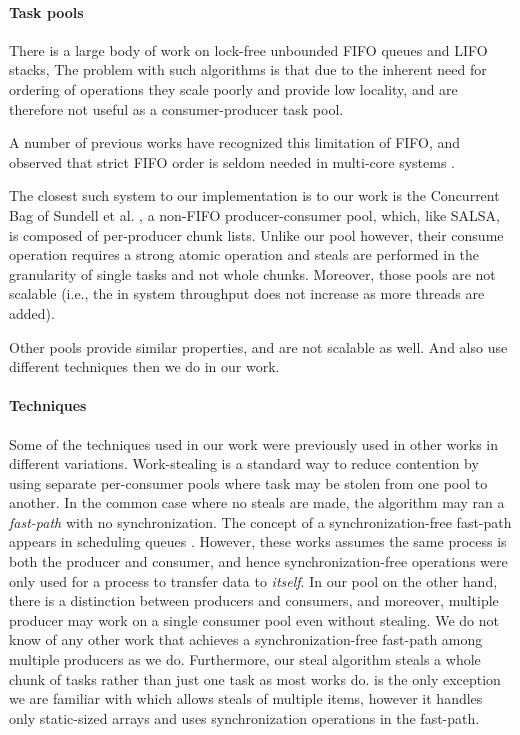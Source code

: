 \paragraph{Task pools\\}
There is a large body of work on lock-free unbounded FIFO queues and LIFO
stacks\cite{Gidenstam:2010:CLQ:1940234.1940266,Hendler:2004:SLS:1007912.1007944,
Hoffman:2007:BQ:1782394.1782423, Michael:1996:SFP:248052.248106,Moir:2005:UEI:1073970.1074013},
The problem with such algorithms is that due to the inherent need for ordering of operations they
scale poorly and provide low locality, and are therefore not useful as a consumer-producer task
pool. 

A number of previous works have recognized this limitation of FIFO, and observed that strict FIFO
order is seldom needed in multi-core systems
\cite{Afek:2010:SPP:1885276.1885295,springerlink:10.1007/978-3-642-17653-1_29,
Basin:2011:CST:2075029.2075087,Sundell:2011:LAC:1989493.1989550}. 

The closest such system to our implementation is to our work is the Concurrent Bag of Sundell et al.
\cite{Sundell:2011:LAC:1989493.1989550}, a non-FIFO producer-consumer pool, which, like SALSA, is
composed of per-producer chunk lists. Unlike our pool however, their consume operation requires a
strong atomic operation and steals are performed in the granularity of single tasks and not whole
chunks. Moreover, those pools are not scalable (i.e., the in system throughput does not increase as
more threads are added).

Other pools provide similar properties, and are not scalable as well. And also use different
techniques then we do in our work.

\paragraph{Techniques\\}
Some of the techniques used in our work were previously used in other works in different
variations. Work-stealing is a standard way to reduce contention by using separate per-consumer
pools \cite{Blumofe:1999:SMC:324133.324234} where task may be stolen from one pool to another.
In the common case where no steals are made, the algorithm may ran a \emph{fast-path} with
no synchronization. The concept of a synchronization-free fast-path appears in scheduling queues
\cite{Arora:1998:TSM:277651.277678}. However, these works assumes the same process is both the
producer and consumer, and hence synchronization-free operations were only used for a process to
transfer data to \emph{itself}. In our pool on the other hand, there is a distinction between
producers and consumers, and moreover, multiple producer may work on a single consumer pool even
without stealing. We do not know of any other work that achieves a synchronization-free fast-path
among multiple producers as we do. Furthermore, our steal algorithm steals a whole chunk of tasks
rather than just one task as most works do. \cite{Hendler:2002:NSW:571825.571876} is the only
exception we are familiar with which allows steals of multiple items, however it handles only
static-sized arrays and uses synchronization operations in the fast-path. 

